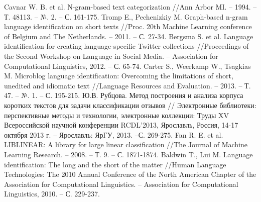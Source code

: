 \documentclass[a4paper, 14pt]{article}
\begin{document}
  \begin{thebibliography}{99}
     Cavnar W. B. et al. N-gram-based text categorization //Ann Arbor MI. – 1994. – Т. 48113. – №. 2. – С. 161-175.
     Tromp E., Pechenizkiy M. Graph-based n-gram language identification on short texts //Proc. 20th Machine Learning conference of Belgium and The Netherlands. – 2011. – С. 27-34.
     Bergsma S. et al. Language identification for creating language-specific Twitter collections //Proceedings of the Second Workshop on Language in Social Media. – Association for Computational Linguistics, 2012. – С. 65-74.
     Carter S., Weerkamp W., Tsagkias M. Microblog language identification: Overcoming the limitations of short, unedited and idiomatic text //Language Resources and Evaluation. – 2013. – Т. 47. – №. 1. – С. 195-215.
     Ю.В. Рубцова. Метод построения и анализа корпуса коротких текстов для задачи классификации отзывов // Электронные библиотеки: перспективные методы и технологии, электронные коллекции: Труды XV Всероссийской научной конференции RCDL’2013, Ярославль, Россия, 14-17 октября 2013 г. – Ярославль: ЯрГУ, 2013. –С. 269-275.
     Fan R. E. et al. LIBLINEAR: A library for large linear classification //The Journal of Machine Learning Research. – 2008. – Т. 9. – С. 1871-1874.
     Baldwin T., Lui M. Language identification: The long and the short of the matter //Human Language Technologies: The 2010 Annual Conference of the North American Chapter of the Association for Computational Linguistics. – Association for Computational Linguistics, 2010. – С. 229-237.
  \end{thebibliography}
\end{document}
